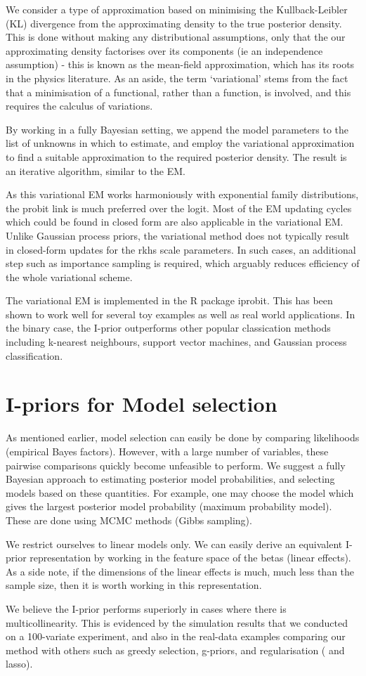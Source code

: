 We consider a type of approximation based on minimising the Kullback-Leibler (KL) divergence from the approximating density to the true posterior density. This is done without making any distributional assumptions, only that the our approximating density factorises over its components (ie an independence assumption) - this is known as the mean-field approximation, which has its roots in the physics literature. As an aside, the term ‘variational’ stems from the fact that a minimisation of a functional, rather than a function, is involved, and this requires the calculus of variations.

By working in a fully Bayesian setting, we append the model parameters to the list of unknowns in which to estimate, and employ the variational approximation to find a suitable approximation to the required posterior density. The result is an iterative algorithm, similar to the EM.

As this variational EM works harmoniously with exponential family distributions, the probit link is much preferred over the logit. Most of the EM updating cycles which could be found in closed form are also applicable in the variational EM. Unlike Gaussian process priors, the variational method does not typically result in closed-form updates for the \gls{rkhs} scale parameters. In such cases, an additional step such as importance sampling is required, which arguably reduces efficiency of the whole variational scheme.

The variational EM is implemented in the R package iprobit. This has been shown to work well for several toy examples as well as real world applications. In the binary case, the I-prior outperforms other popular classication methods including k-nearest neighbours, support vector machines, and Gaussian process classification.

\section{I-priors for Model selection}
 
As mentioned earlier, model selection can easily be done by comparing likelihoods (empirical Bayes factors). However, with a large number of variables, these pairwise comparisons quickly become unfeasible to perform. We suggest a fully Bayesian approach to estimating posterior model probabilities, and selecting models based on these quantities. For example, one may choose the model which gives the largest posterior model probability (maximum probability model). These are done using MCMC methods (Gibbs sampling).

We restrict ourselves to linear models only. We can easily derive an equivalent I-prior representation by working in the feature space of the betas (linear effects). As a side note, if the dimensions of the linear effects is much, much less than the sample size, then it is worth working in this representation.

We believe the I-prior performs superiorly in cases where there is multicollinearity. This is evidenced by the simulation results that we conducted on a 100-variate experiment, and also in the real-data examples comparing our method with others such as greedy selection, g-priors, and regularisation ( and \gls{lasso}).
